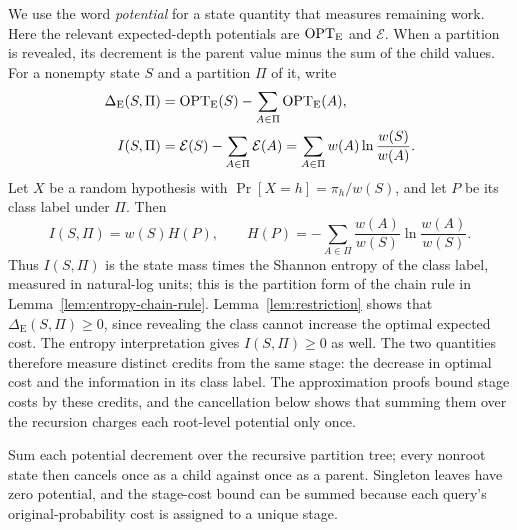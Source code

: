 We use the word \emph{potential} for a state quantity that measures
remaining work. Here the relevant expected-depth potentials are
$\operatorname{OPT}_{\mathrm E}$ and $\mathcal E$. When a partition is revealed, its
decrement is the parent value minus the sum of the child values.
For a nonempty state $S$ and a partition $\Pi$ of it, write
\[
 \begin{split}
  \Delta_{\mathrm E}(S,\Pi)&=\operatorname{OPT}_{\mathrm E}(S)
                     -\sum_{A\in\Pi}\operatorname{OPT}_{\mathrm E}(A),\\
  I(S,\Pi)&=\mathcal E(S)-\sum_{A\in\Pi}\mathcal E(A)
           =\sum_{A\in\Pi}w(A)\ln\frac{w(S)}{w(A)}.
  \end{split}
 \]
  Let $X$ be a random hypothesis with
 $\Pr[X=h]=\pi_h/w(S)$, and let $P$ be its class label under $\Pi$.
 Then
 \[
  I(S,\Pi)=w(S)H(P),\qquad
  H(P)=-\sum_{A\in\Pi}\frac{w(A)}{w(S)}
                          \ln\frac{w(A)}{w(S)}.
 \]
Thus $I(S,\Pi)$ is the state mass times the Shannon entropy of the
class label, measured in natural-log units; this is the partition
form of the chain rule in Lemma~\ref{lem:entropy-chain-rule}.
Lemma~\ref{lem:restriction} shows that
$\Delta_{\mathrm E}(S,\Pi)\ge0$, since revealing the class cannot
increase the optimal expected cost. The entropy interpretation gives
$I(S,\Pi)\ge0$ as well. The two quantities therefore measure distinct
credits from the same stage: the decrease in optimal cost and the
information in its class label. The approximation proofs bound stage
costs by these credits, and the cancellation below shows that summing
them over the recursion charges each root-level potential only once.

\begin{proofstrategy}
Sum each potential decrement over the recursive partition tree; every
nonroot state then cancels once as a child against once as a parent.
Singleton leaves have zero potential, and the stage-cost bound can be
summed because each query's original-probability cost is assigned to
a unique stage.
\end{proofstrategy}

